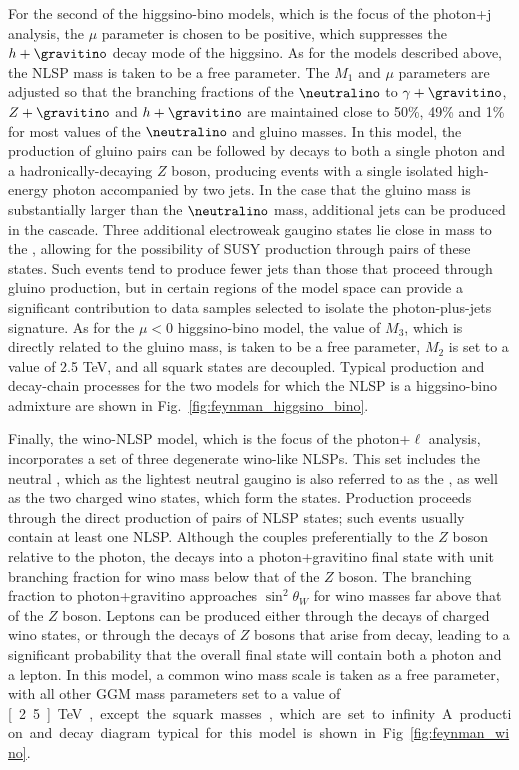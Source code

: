 For the second of the higgsino-bino models, which is
the focus of the photon+j analysis, the $\mu$ parameter is
chosen to be positive, which suppresses the $h + \gravitino$
decay mode of the higgsino. As for the models described above,
the NLSP mass is taken to be a free parameter.
The $M_1$ and $\mu$ parameters are adjusted so that the branching
fractions of the $\neutralino$ to $\gamma + \gravitino$, $Z + \gravitino$
and $h + \gravitino$ are maintained close to 50\%, 49\% and 1\% for
most values of the $\neutralino$ and gluino masses.
In this model, the production of gluino pairs can be followed
by decays to both a single photon and a hadronically-decaying $Z$ boson, producing
events with a single isolated high-energy photon accompanied
by two jets.
In the case that the gluino mass is substantially
larger than the $\neutralino$ mass, additional jets can
be produced in the cascade.
Three additional electroweak gaugino states
lie close in mass to the \neutralino, allowing for the
possibility of SUSY production through pairs of these
states. Such events tend to produce fewer jets than those that proceed through gluino production,
but in certain regions of the model space can provide a significant
contribution to data samples selected to isolate the photon-plus-jets
signature. As for the $\mu < 0$ higgsino-bino model, the value of $M_3$, which is directly
related to the gluino mass, is taken to be a free parameter, $M_2$ is
set to a value of 2.5 TeV, and all squark states are decoupled.
Typical production and decay-chain processes for the two models
for which the NLSP is a higgsino-bino admixture are shown in Fig.~\ref{fig:feynman_higgsino_bino}.


Finally, the wino-NLSP model, which is the focus of the photon+$\ell$ analysis,
incorporates a set of three degenerate wino-like
NLSPs. This set includes the neutral \winon, which as the lightest
neutral gaugino is also referred to as the \neutralino,
as well as the two charged wino states, which form the \chargino states.
Production proceeds
through the direct production of pairs of NLSP states;
such events usually contain at least one \winon NLSP. Although
the \winon couples preferentially to the $Z$ boson relative to
the photon, the \winon decays into a photon+gravitino final state with unit branching fraction
for wino mass below that of the $Z$ boson.
The \winon branching fraction to photon+gravitino approaches
$\sin^2 \theta_W$ for wino masses far above that of the $Z$ boson.
Leptons can be produced either through the decays of charged wino
states, or through the decays of $Z$ bosons that arise from \winon
decay, leading to a significant probability that the overall final state
will contain both a photon and a lepton. In this model,
a common wino mass scale is taken as a free parameter, with
all other GGM mass parameters set to a value of \unit[2.5]{TeV}, except the squark masses,
which are set to infinity.
A production and decay diagram typical for this model is shown in Fig.~\ref{fig:feynman_wino}.


